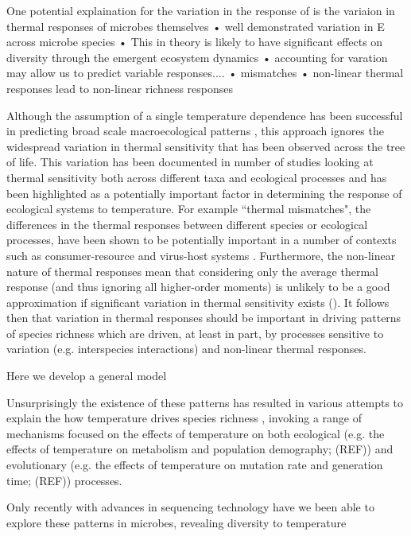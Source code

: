 \documentclass{article}
\begin{document}
One potential explaination for the variation in the response of is the variaion in thermal responses of microbes themselves
• well demonstrated variation in E across microbe species
• This in theory is likely to have significant effects on diversity through the emergent ecosystem dynamics
• accounting for varation may allow us to predict variable responses....
• mismatches
• non-linear thermal responses lead to non-linear richness responses

Although the assumption of a single temperature dependence has been successful in predicting broad scale macroecological patterns \citep{Gillooly2001,Brown2004}, this approach ignores the widespread variation in thermal sensitivity that has been observed across the tree of life. This variation has been documented in number of studies looking at thermal sensitivity both across different taxa and ecological processes \citep{Dell2011} and has been highlighted as a potentially important factor in determining the response of ecological systems to temperature. For example ``thermal mismatches", the differences in the thermal responses between different species or ecological processes, have been shown to be potentially important in a number of contexts such as consumer-resource \citep{Dell2014} and virus-host systems \citep{Demory2021}. Furthermore, the non-linear nature of thermal responses mean that considering only the average thermal response (and thus ignoring all higher-order moments) is unlikely to be a good approximation if significant variation in thermal sensitivity exists (\citet{Savage2004}). It follows then that variation in thermal responses should be important in driving patterns of species richness which are driven, at least in part, by processes sensitive to variation (e.g. interspecies interactions) and non-linear thermal responses.


Here we develop a general model






Unsurprisingly the existence of these patterns has resulted in various attempts to explain the how temperature drives species richness \citep{Rohde1992}, invoking a range of mechanisms focused on the effects of temperature on both ecological (e.g. the effects of temperature on metabolism and population demography; (REF)) and evolutionary (e.g. the effects of temperature on mutation rate and generation time; (REF)) processes.

Only recently with advances in sequencing technology have we been able to explore these patterns in microbes, revealing  diversity to temperature 
\end{document}
